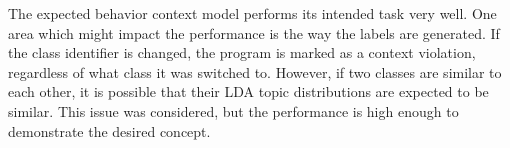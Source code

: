 \documentclass[../stegner_thesis.tex]{subfiles}
\begin{document}
\par The expected behavior context model performs its intended task very well.
One area which might impact the performance is the way the labels are
generated.
If the class identifier is changed, the program is marked as a context
violation, regardless of what class it was switched to.
However, if two classes are similar to each other, it is possible that their
LDA topic distributions are expected to be similar.
This issue was considered, but the performance is high enough to demonstrate
the desired concept.

\newpage
\end{document}
